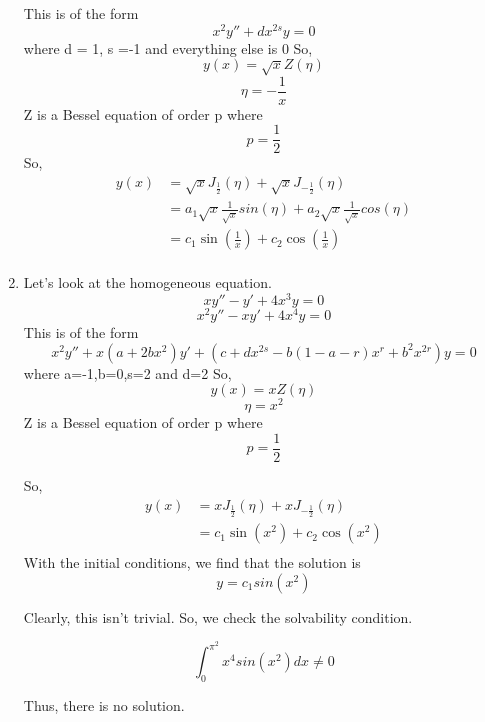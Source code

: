 \documentclass[letterpaper,12pt]{article}
\begin{document}
\begin{enumerate}
This is of the form
\[x^2 y'' + dx^{2s}y=0\]
where d = 1, s =-1 and everything else is 0
So,
\[y(x)= \sqrt{x}Z(\eta )\]
\[\eta = -\frac{1}{x}\]
Z is a Bessel equation of order p where
\[p =  \frac{1}{2}\]
So,
\begin{align*}
y(x) &= \sqrt{x}J_{\frac{1}{2}}(\eta)+ \sqrt{x}J_{-\frac{1}{2}}(\eta)\\
&= a_1 \sqrt{x}\frac{1}{\sqrt{x}}sin(\eta )+a_2 \sqrt{x}\frac{1}{\sqrt{x}}cos(\eta ) \\
&= c_1 \sin(\frac{1}{x} )+c_2 \cos(\frac{1}{x}) \\
\end{align*}
\item
 Let's look at the homogeneous equation.
 \[xy'' -y'+4x^3y=0\]
  \[x^2y'' -xy'+4x^4y=0\]
	This is of the form
	\[x^2 y'' +x(a+2bx^2)y'+(c+dx^{2s}-b(1-a-r)x^r+b^2x^{2r})y=0\]
	where a=-1,b=0,s=2 and d=2
	So,
	\[y(x)= xZ(\eta )\]
	\[\eta = x^2\]
	Z is a Bessel equation of order p where
	\[p =  \frac{1}{2}\]

	So,
	\begin{align*}
	y(x) &= xJ_{\frac{1}{2}}(\eta)+ x J_{-\frac{1}{2}}(\eta)\\
	&= c_1 \sin( x^2 )+c_2 \cos( x^2) \\
	\end{align*}
	With the initial conditions, we find that the solution is
	\[y = c_1 sin(x^2)\]

	Clearly, this isn't trivial. So, we check the solvability condition.

	\[\int_0^{\pi^2}x^4sin(x^2)dx \neq 0\]

	Thus, there is no solution.
\end{enumerate}
\end{document}
